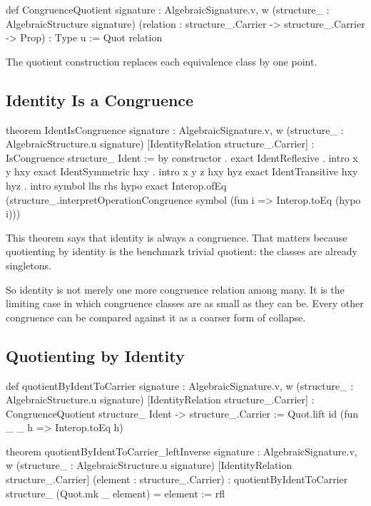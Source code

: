\documentclass[11pt]{article}
\begin{document}
\begin{leanblock}
def CongruenceQuotient
    {signature : AlgebraicSignature.{v, w}}
    (structure_ : AlgebraicStructure signature)
    (relation : structure_.Carrier -> structure_.Carrier -> Prop) : Type u :=
  Quot relation
\end{leanblock}

The quotient construction replaces each equivalence class by one point.

\subsection{Identity Is a Congruence}

\begin{leanblock}
theorem IdentIsCongruence
    {signature : AlgebraicSignature.{v, w}}
    (structure_ : AlgebraicStructure.{u} signature)
    [IdentityRelation structure_.Carrier] :
    IsCongruence structure_ Ident := by
  constructor
  . exact IdentReflexive
  . intro x y hxy
    exact IdentSymmetric hxy
  . intro x y z hxy hyz
    exact IdentTransitive hxy hyz
  . intro symbol lhs rhs hypo
    exact Interop.ofEq
      (structure_.interpretOperationCongruence symbol
        (fun i => Interop.toEq (hypo i)))
\end{leanblock}

This theorem says that identity is always a congruence. That matters because quotienting by identity is the benchmark trivial quotient: the classes are already singletons.

So identity is not merely one more congruence relation among many. It is the limiting case in which congruence classes are as small as they can be. Every other congruence can be compared against it as a coarser form of collapse.

\subsection{Quotienting by Identity}

\begin{leanblock}
def quotientByIdentToCarrier
    {signature : AlgebraicSignature.{v, w}}
    (structure_ : AlgebraicStructure.{u} signature)
    [IdentityRelation structure_.Carrier] :
    CongruenceQuotient structure_ Ident -> structure_.Carrier :=
  Quot.lift id (fun _ _ h => Interop.toEq h)
\end{leanblock}

\begin{leanblock}
theorem quotientByIdentToCarrier_leftInverse
    {signature : AlgebraicSignature.{v, w}}
    (structure_ : AlgebraicStructure.{u} signature)
    [IdentityRelation structure_.Carrier]
    (element : structure_.Carrier) :
    quotientByIdentToCarrier structure_ (Quot.mk _ element) = element :=
  rfl
\end{leanblock}
\end{document}
